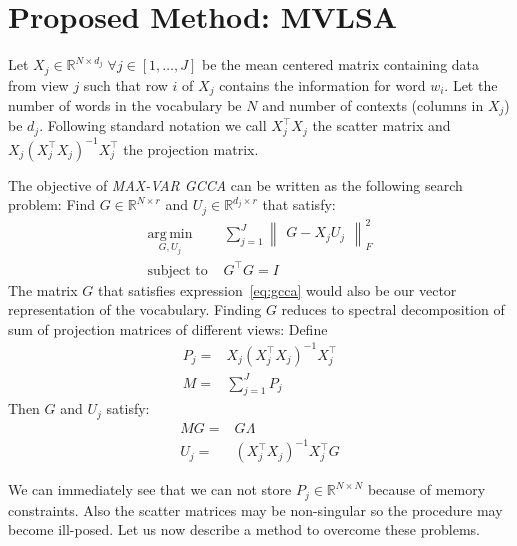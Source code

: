 \documentclass[11pt]{article}
\begin{document}
\section{Proposed Method: MVLSA}
\label{sec:gcca}
Let $X_j \in \mathbb{R}^{N\times d_j} \;
\forall j \in [1,\ldots,J]$ be the mean centered matrix containing
data from view $j$ such that row $i$ of $X_j$ contains the information for
word $w_i$. Let the number of words in the vocabulary be $N$
and number of contexts (columns in $X_j$) be $d_j$. %
Following standard
notation \cite{hastie2009elements} we call $X_j^\top X_j$ the scatter
matrix and $X_j (X_j^\top X_j)^{-1}X_j^\top$ the projection matrix.

The objective of \emph{MAX-VAR GCCA} can be written as the following search problem:
 Find $G \in \mathbb{R}^{N\times r}$ and $U_j \in
\mathbb{R}^{d_j \times r}$ that satisfy:
\begin{equation}
  \label{eq:gcca}
\begin{split}
  \operatorname*{\arg\,\min}_{G,U_j} & \sum_{j=1}^J \begin{Vmatrix} G - X_jU_j \end{Vmatrix}^2_F \\
  \text{subject to } & G^\top G = I
\end{split}
\end{equation}
The matrix $G$ that satisfies expression~\ref{eq:gcca} would also be our
vector representation of the vocabulary.
Finding $G$ reduces to spectral decomposition of sum of projection matrices of different views: Define
\begin{align}
P_j =& X_j(X_j^\top X_j)^{-1}X_j^\top \label{eq:pp}\\
M =& \sum_{j=1}^J P_j \label{eq:mm}
\end{align}
Then $G$ and $U_j$ satisfy:
\begin{align}
M G =& G \Lambda\\
U_j =& \left(X_j^\top X_j\right)^{-1} X_j^\top G
\end{align}


We can immediately see that we can not store
 $P_j \in \mathbb{R}^{N \times N}$ because of memory constraints.
Also the scatter matrices may be non-singular so the procedure may become
ill-posed. 
Let us now describe a method to overcome these problems.
\end{document}
